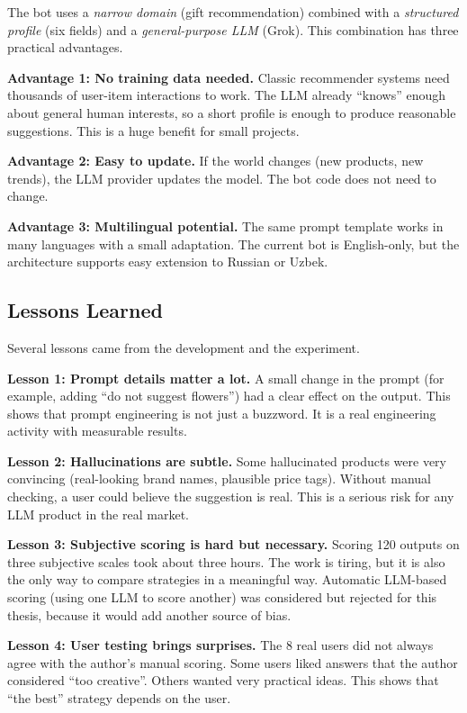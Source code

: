 The bot uses a \textit{narrow domain} (gift recommendation) combined with a \textit{structured profile} (six fields) and a \textit{general-purpose LLM} (Grok). This combination has three practical advantages.

\textbf{Advantage 1: No training data needed.} Classic recommender systems need thousands of user-item interactions to work. The LLM already ``knows'' enough about general human interests, so a short profile is enough to produce reasonable suggestions. This is a huge benefit for small projects.

\textbf{Advantage 2: Easy to update.} If the world changes (new products, new trends), the LLM provider updates the model. The bot code does not need to change.

\textbf{Advantage 3: Multilingual potential.} The same prompt template works in many languages with a small adaptation. The current bot is English-only, but the architecture supports easy extension to Russian or Uzbek.

\subsection{Lessons Learned}

Several lessons came from the development and the experiment.

\textbf{Lesson 1: Prompt details matter a lot.} A small change in the prompt (for example, adding ``do not suggest flowers'') had a clear effect on the output. This shows that prompt engineering is not just a buzzword. It is a real engineering activity with measurable results.

\textbf{Lesson 2: Hallucinations are subtle.} Some hallucinated products were very convincing (real-looking brand names, plausible price tags). Without manual checking, a user could believe the suggestion is real. This is a serious risk for any LLM product in the real market.

\textbf{Lesson 3: Subjective scoring is hard but necessary.} Scoring 120 outputs on three subjective scales took about three hours. The work is tiring, but it is also the only way to compare strategies in a meaningful way. Automatic LLM-based scoring (using one LLM to score another) was considered but rejected for this thesis, because it would add another source of bias.

\textbf{Lesson 4: User testing brings surprises.} The 8 real users did not always agree with the author's manual scoring. Some users liked answers that the author considered ``too creative''. Others wanted very practical ideas. This shows that ``the best'' strategy depends on the user.

